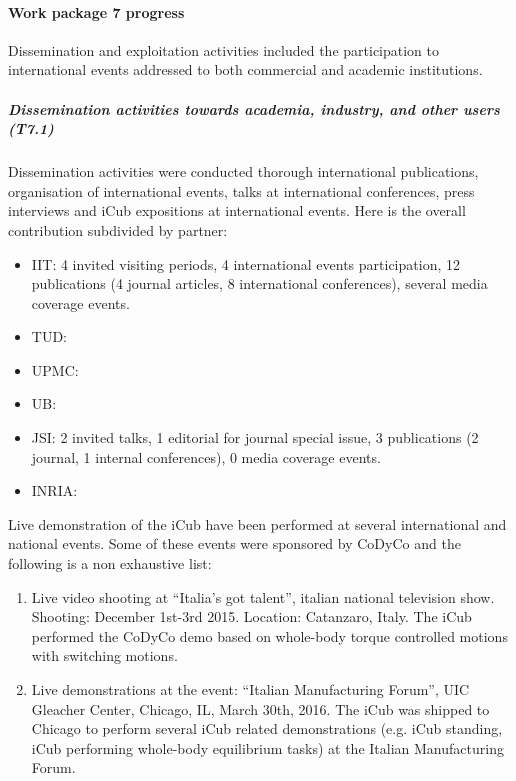 

\paragraph{Work package 7 progress}

Dissemination and exploitation activities included the participation to international events addressed to both commercial and academic institutions. 

\subparagraph*{Dissemination activities towards academia, industry, and other users (T7.1)}

Dissemination activities were conducted thorough international publications, organisation of international events, talks at international conferences, press interviews and iCub expositions at international events. Here is the overall contribution subdivided by partner:

\begin{itemize}

\item IIT: 4 invited visiting periods, 4 international events participation, 12 publications (4 journal articles, 8 international conferences), several media coverage events.

\item TUD: 

\item UPMC: 

\item UB: 

\item JSI: 2 invited talks, 1 editorial for journal special issue, 3 publications (2 journal, 1 internal conferences), 0 media coverage events.

\item INRIA: 

\end{itemize}

Live demonstration of the iCub have been performed at several international and national events.  Some of these events were sponsored by CoDyCo and the following is a non exhaustive list:

\begin{enumerate}

\item Live video shooting at ``Italia's got talent'', italian national television show. Shooting: December 1st-3rd 2015. Location: Catanzaro, Italy. The iCub performed the CoDyCo demo based on whole-body torque controlled motions with switching motions.

\item Live demonstrations at the event: ``Italian Manufacturing Forum'', UIC Gleacher Center, Chicago, IL, March 30th, 2016. The iCub was shipped to Chicago to perform several iCub related demonstrations (e.g. iCub standing, iCub performing whole-body equilibrium tasks) at the Italian Manufacturing Forum. 

\end{enumerate} 

